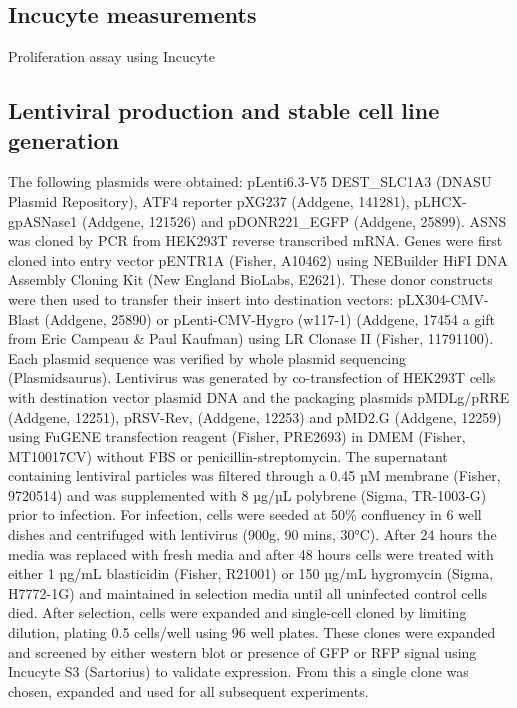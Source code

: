 \subsection{Incucyte measurements}
Proliferation assay using Incucyte



\subsection{Lentiviral production and stable cell line generation}
The following plasmids were obtained: pLenti6.3-V5 DEST\_SLC1A3 (DNASU Plasmid Repository), ATF4 reporter pXG237 (Addgene, 141281), pLHCX-gpASNase1 (Addgene, 121526) and pDONR221\_EGFP (Addgene, 25899).
ASNS was cloned by PCR from HEK293T reverse transcribed mRNA.
Genes were first cloned into entry vector pENTR1A (Fisher, A10462) using NEBuilder HiFI DNA Assembly Cloning Kit (New England BioLabs, E2621).
These donor constructs were then used to transfer their insert into destination vectors: pLX304-CMV-Blast (Addgene, 25890) or pLenti-CMV-Hygro (w117-1) (Addgene, 17454 a gift from Eric Campeau \& Paul Kaufman) using LR Clonase II (Fisher, 11791100).
Each plasmid sequence was verified by whole plasmid sequencing (Plasmidsaurus).
Lentivirus was generated by co-transfection of HEK293T cells with destination vector plasmid DNA and the packaging plasmids pMDLg/pRRE (Addgene, 12251), pRSV-Rev, (Addgene, 12253) and pMD2.G (Addgene, 12259) using FuGENE transfection reagent (Fisher, PRE2693) in DMEM (Fisher, MT10017CV) without FBS or penicillin-streptomycin.
The supernatant containing lentiviral particles was filtered through a 0.45 µM membrane (Fisher, 9720514) and was supplemented with 8 µg/µL polybrene (Sigma, TR-1003-G) prior to infection.
For infection, cells were seeded at 50\% confluency in 6 well dishes and centrifuged with lentivirus (900g, 90 mins, 30°C).
After 24 hours the media was replaced with fresh media and after 48 hours cells were treated with either 1 µg/mL blasticidin (Fisher, R21001) or 150 µg/mL hygromycin (Sigma, H7772-1G) and maintained in selection media until all uninfected control cells died.
After selection, cells were expanded and single-cell cloned by limiting dilution, plating 0.5 cells/well using 96 well plates.
These clones were expanded and screened by either western blot or presence of GFP or RFP signal using Incucyte S3 (Sartorius) to validate expression.
From this a single clone was chosen, expanded and used for all subsequent experiments.


